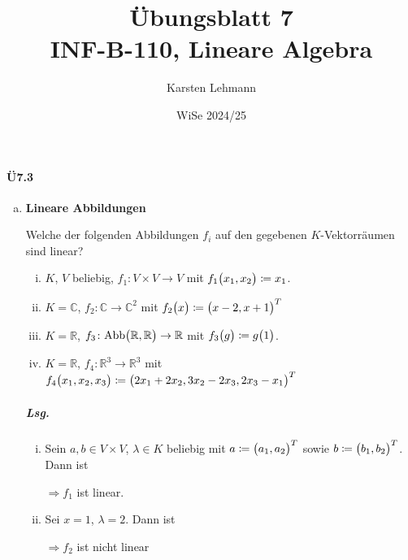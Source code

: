 \documentclass{scrreprt}
\author{Karsten Lehmann}
\date{WiSe 2024/25}
\title{Übungsblatt 7\\INF-B-110, Lineare Algebra}
\begin{document}
\paragraph{Ü7.3}
\begin{enumerate}[(a)]
\item \textbf{Lineare Abbildungen}

  Welche der folgenden Abbildungen $f_i$ auf den gegebenen $K$-Vektorräumen sind
  linear?

  \begin{enumerate}[(i)]
  \item $K$, $V$ beliebig, $f_1 \colon V \times V \to V$ mit
    $f_1\qty\big(x_1, x_2) \coloneqq x_1$.

  \item $K = \mathbb{C}$, $f_2 \colon \mathbb{C} \to \mathbb{C}^2$ mit
    $f_2\qty\big(x) \coloneqq \qty\big(x - 2, x + 1)^T$

  \item $K = \mathbb{R}$,
    $f_3 \colon \text{Abb}\qty\big(\mathbb{R}, \mathbb{R}) \to \mathbb{R}$ mit
    $f_3\qty\big(g) \coloneqq g\qty\big(1)$.

  \item $K = \mathbb{R}$, $f_4 \colon \mathbb{R}^3 \to \mathbb{R}^3$ mit
    $f_4 \qty\big(x_1, x_2, x_3) \coloneqq
    \qty\big(2x_1 + 2x_2, 3x_2 - 2x_3, 2x_3 - x_1)^T$
  \end{enumerate}

  \subparagraph{Lsg.}
  \begin{enumerate}[(i)]
  \item Sein $a, b \in V \times V$, $\lambda \in K$ beliebig mit
    $a \coloneqq \qty\big(a_1, a_2)^T$ sowie $b \coloneqq \qty\big(b_1, b_2)^T$.
    Dann ist
    $\Rightarrow f_1$ ist linear.

  \item Sei $x = 1$, $\lambda = 2$.
    Dann ist
    $\Rightarrow f_2$ ist nicht linear


\end{enumerate}
\end{enumerate}
\end{document}
